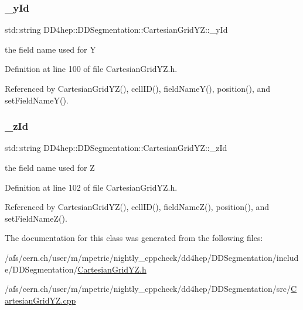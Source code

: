 \subsubsection{\texorpdfstring{\+\_\+y\+Id}{\_yId}}
{\footnotesize\ttfamily std\+::string D\+D4hep\+::\+D\+D\+Segmentation\+::\+Cartesian\+Grid\+Y\+Z\+::\+\_\+y\+Id\hspace{0.3cm}{\ttfamily [protected]}}



the field name used for Y 



Definition at line 100 of file Cartesian\+Grid\+Y\+Z.\+h.



Referenced by Cartesian\+Grid\+Y\+Z(), cell\+I\+D(), field\+Name\+Y(), position(), and set\+Field\+Name\+Y().

\hypertarget{class_d_d4hep_1_1_d_d_segmentation_1_1_cartesian_grid_y_z_ad2f85ca98f4c77d7dcad2f949b8ea7e1}{}\label{class_d_d4hep_1_1_d_d_segmentation_1_1_cartesian_grid_y_z_ad2f85ca98f4c77d7dcad2f949b8ea7e1} 
\subsubsection{\texorpdfstring{\+\_\+z\+Id}{\_zId}}
{\footnotesize\ttfamily std\+::string D\+D4hep\+::\+D\+D\+Segmentation\+::\+Cartesian\+Grid\+Y\+Z\+::\+\_\+z\+Id\hspace{0.3cm}{\ttfamily [protected]}}



the field name used for Z 



Definition at line 102 of file Cartesian\+Grid\+Y\+Z.\+h.



Referenced by Cartesian\+Grid\+Y\+Z(), cell\+I\+D(), field\+Name\+Z(), position(), and set\+Field\+Name\+Z().



The documentation for this class was generated from the following files\+:\begin{DoxyCompactItemize}
\item 
/afs/cern.\+ch/user/m/mpetric/nightly\+\_\+cppcheck/dd4hep/\+D\+D\+Segmentation/include/\+D\+D\+Segmentation/\hyperlink{_d_d_segmentation_2include_2_d_d_segmentation_2_cartesian_grid_y_z_8h}{Cartesian\+Grid\+Y\+Z.\+h}\item 
/afs/cern.\+ch/user/m/mpetric/nightly\+\_\+cppcheck/dd4hep/\+D\+D\+Segmentation/src/\hyperlink{_d_d_segmentation_2src_2_cartesian_grid_y_z_8cpp}{Cartesian\+Grid\+Y\+Z.\+cpp}\end{DoxyCompactItemize}
